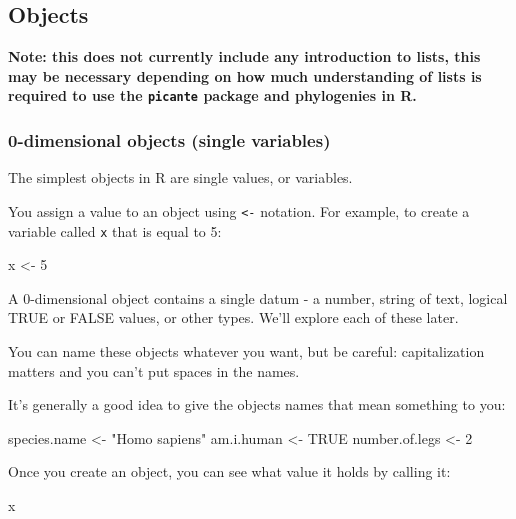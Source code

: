 \documentclass[]{article}
\newenvironment{Shaded}{\begin{snugshade}}{\end{snugshade}}
\newcommand{\DecValTok}[1]{\textcolor[rgb]{0.00,0.00,0.81}{#1}}
\newcommand{\StringTok}[1]{\textcolor[rgb]{0.31,0.60,0.02}{#1}}
\newcommand{\OtherTok}[1]{\textcolor[rgb]{0.56,0.35,0.01}{#1}}
\newcommand{\NormalTok}[1]{#1}
\begin{document}
\subsection{Objects}\label{objects}

\textbf{Note: this does not currently include any introduction to lists,
this may be necessary depending on how much understanding of lists is
required to use the \texttt{picante} package and phylogenies in R.}

\subsubsection{0-dimensional objects (single
variables)}\label{dimensional-objects-single-variables}

The simplest objects in R are single values, or variables.

You assign a value to an object using \texttt{\textless{}-} notation.
For example, to create a variable called \texttt{x} that is equal to 5:

\begin{Shaded}
\begin{Highlighting}[]
\NormalTok{x <-}\StringTok{ }\DecValTok{5}
\end{Highlighting}
\end{Shaded}

A 0-dimensional object contains a single datum - a number, string of
text, logical TRUE or FALSE values, or other types. We'll explore each
of these later.

You can name these objects whatever you want, but be careful:
capitalization matters and you can't put spaces in the names.

It's generally a good idea to give the objects names that mean something
to you:

\begin{Shaded}
\begin{Highlighting}[]
\NormalTok{species.name <-}\StringTok{ "Homo sapiens"}
\NormalTok{am.i.human <-}\StringTok{ }\OtherTok{TRUE}
\NormalTok{number.of.legs <-}\StringTok{ }\DecValTok{2}
\end{Highlighting}
\end{Shaded}

Once you create an object, you can see what value it holds by calling
it:

\begin{Shaded}
\begin{Highlighting}[]
\NormalTok{x}
\end{Highlighting}
\end{Shaded}
\end{document}
